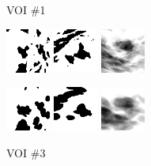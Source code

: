 \documentclass[journal]{IEEEtran}
\begin{document}
\begin{figure}[!htb]

  \centering
  \captionsetup[subfloat]{labelformat=empty}

  {\fontsize{9}{9}\selectfont VOI \#1} \vspace{1mm}

  \includegraphics[width=0.13\textwidth]
  {figure/all/dataset_1/roi_coronal}
  \includegraphics[width=0.13\textwidth]
  {figure/all/dataset_1/roi_saggital}
  \includegraphics[width=0.13\textwidth]
  {figure/all/dataset_1/proj_roi}

  \includegraphics[width=0.13\textwidth]
  {figure/all/dataset_1/model_coronal}
  \includegraphics[width=0.13\textwidth]
  {figure/all/dataset_1/model_saggital}
  \includegraphics[width=0.13\textwidth]
  {figure/all/dataset_1/proj_roi_inten10}

  {\fontsize{9}{9}\selectfont VOI \#3} \vspace{1mm}


\end{figure}
\end{document}
